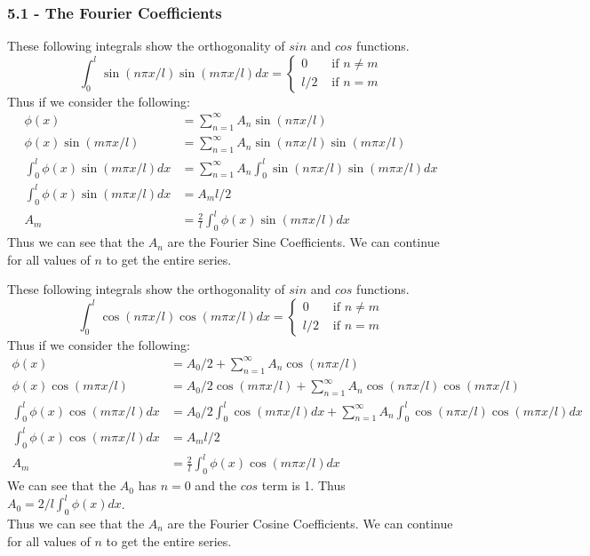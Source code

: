 \documentclass[answers,12pt,addpoints]{exam}
\begin{document}
\subsubsection{5.1 - The Fourier Coefficients}
\begin{definition}
    These following integrals show the orthogonality of $sin$ and $cos$ functions.
    $$ \int_0^l \sin(n\pi x/l) \sin(m\pi x/l) dx = \begin{cases}
        0 & \text{ if } n \neq m \\
        l/2 & \text{ if } n = m
    \end{cases}$$
    Thus if we consider the following:
    \begin{align*}
        \phi(x) &= \sum_{n=1}^\infty A_n \sin(n\pi x/l)\\
        \phi(x) \sin(m\pi x/l) &= \sum_{n=1}^\infty A_n \sin(n\pi x/l) \sin(m\pi x/l)\\
        \int_0^l \phi(x) \sin(m\pi x/l) dx& = \sum_{n=1}^\infty A_n \int_0^l \sin(n\pi x/l) \sin(m\pi x/l) dx\\
        \int_0^l \phi(x) \sin(m\pi x/l) dx &= A_m l/2\\
        A_m &= \frac{2}{l} \int_0^l \phi(x) \sin(m\pi x/l) dx
    \end{align*}
    Thus we can see that the $A_n$ are the Fourier Sine Coefficients.
    We can continue for all values of $n$ to get the entire series.
\end{definition}
\begin{definition}
    These following integrals show the orthogonality of $sin$ and $cos$ functions.
    $$ \int_0^l \cos(n\pi x/l) \cos(m\pi x/l) dx = \begin{cases}
        0 & \text{ if } n \neq m \\
        l/2 & \text{ if } n = m
    \end{cases}$$
    Thus if we consider the following:
    \begin{align*}
        \phi(x) &= A_0/2 + \sum_{n=1}^\infty A_n \cos(n\pi x/l)\\
        \phi(x) \cos(m\pi x/l) &= A_0/2 \cos(m\pi x/l) + \sum_{n=1}^\infty A_n \cos(n\pi x/l) \cos(m\pi x/l)\\
        \int_0^l \phi(x) \cos(m\pi x/l) dx& = A_0/2 \int_0^l \cos(m\pi x/l) dx + \sum_{n=1}^\infty A_n \int_0^l \cos(n\pi x/l) \cos(m\pi x/l) dx\\
        \int_0^l \phi(x) \cos(m\pi x/l) dx &= A_m l/2\\
        A_m &= \frac{2}{l} \int_0^l \phi(x) \cos(m\pi x/l) dx
    \end{align*}
    We can see that the $A_0$ has $n=0$ and the $cos$ term is 1. Thus $A_0 = 2/l \int_0^l \phi(x) dx$.\\
    Thus we can see that the $A_n$ are the Fourier Cosine Coefficients.
    We can continue for all values of $n$ to get the entire series.
\end{definition}
\end{document}
